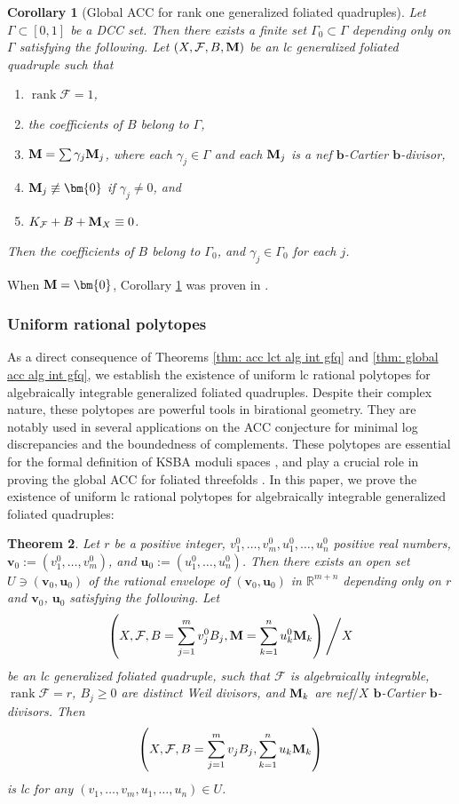 \documentclass[11pt]{amsart}
\numberwithin{equation}{section}
\newcommand{\bb}{\bm{b}}
\newcommand{\Mm}{{\bf{M}}}
\newcommand{\rk}{\operatorname{rank}}
\newcommand{\Ff}{\mathcal{F}}
\newcommand{\Ii}{\Gamma}
\newtheorem{thm}{Theorem}[subsection]
\newtheorem{cor}[thm]{Corollary}
\theoremstyle{definition}
\theoremstyle{definition}
\theoremstyle{definition}
\begin{document}
\begin{cor}[Global ACC for rank one generalized foliated quadruples]\label{cor: global acc rank 1 gfq}
Let $\Ii\subset [0,1]$ be a DCC set. Then there exists a finite set $\Ii_0\subset\Ii$ depending only on $\Ii$ satisfying the following. Let $(X,\Ff,B,\Mm)$ be an lc generalized foliated quadruple such that
\begin{enumerate}
\item $\rk\Ff=1$,
\item the coefficients of $B$ belong to $\Ii$, 
\item  $\Mm=\sum\gamma_j\Mm_j$, where each $\gamma_j\in\Ii$ and each $\Mm_j$ is a nef $\bb$-Cartier $\bb$-divisor,
\item $\Mm_j\not\equiv\bm{0}$ if $\gamma_j\not=0$, and
\item $K_{\Ff}+B+\Mm_X\equiv 0$.
\end{enumerate}
Then the coefficients of $B$ belong to $\Ii_0$, and $\gamma_j\in\Ii_0$ for each $j$.
\end{cor}

When $\Mm=\bm{0}$, Corollary \ref{cor: global acc rank 1 gfq} was proven in \cite[Corollary 1.3]{DLM23}.

\subsubsection{Uniform rational polytopes} As a direct consequence of Theorems \ref{thm: acc lct alg int gfq} and \ref{thm: global acc alg int gfq}, we establish the existence of uniform lc rational polytopes for algebraically integrable generalized foliated quadruples. Despite their complex nature, these polytopes are powerful tools in birational geometry. They are notably used in several applications on the ACC conjecture for minimal log discrepancies and the boundedness of complements. These polytopes are essential for the formal definition of KSBA moduli spaces \cite[6.27.3, Theorem 11.49]{Kol23}, and play a crucial role in proving the global ACC for foliated threefolds \cite{LMX23b}. In this paper, we prove the existence of uniform lc rational polytopes for algebraically integrable generalized foliated quadruples:

\begin{thm}\label{thm: uniform rational polytope gfq}
Let $r$ be a positive integer, $v_1^0,\dots,v_m^0,u_1^0,\dots,u_n^0$ positive real numbers, $\bm{v}_0:=(v_1^0,\dots,v_m^0)$, and $\bm{u}_0:=(u_1^0,\dots,u_n^0)$. Then there exists an open set $U\ni (\bm{v}_0,\bm{u}_0)$ of the rational envelope of $(\bm{v}_0,\bm{u}_0)$ in $\mathbb R^{m+n}$ depending only on $r$ and $\bm{v}_0$, $\bm{u}_0$ satisfying the following. Let $$\left(X,\Ff,B=\sum_{j=1}^mv_j^0B_j,\Mm=\sum_{k=1}^nu_k^0\Mm_k\right)\Bigg{/}X$$ be an lc generalized foliated quadruple, such that $\Ff$ is algebraically integrable, $\rk\Ff=r$, $B_j\geq 0$ are distinct Weil divisors, and $\Mm_k$ are nef$/X$ $\bb$-Cartier $\bb$-divisors. Then $$\left(X,\Ff,B=\sum_{j=1}^mv_jB_j,\sum_{k=1}^nu_k\Mm_k\right)$$ is lc for any $(v_1,\dots,v_m,u_1,\dots,u_n)\in U$.
\end{thm}
\end{document}
